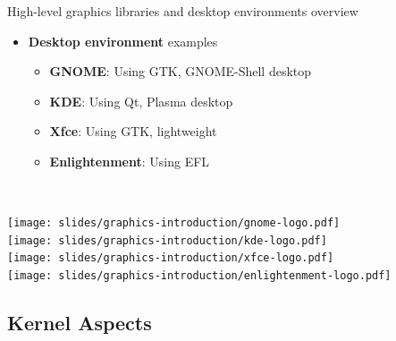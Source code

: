 \begin{frame}{High-level graphics libraries and desktop environments overview}
\begin{minipage}[b]{0.8\textwidth}
\begin{itemize}
  \textit{gives a consistent look and feel across the system}
  \item \textbf{Desktop environment} examples
    \begin{itemize}
    \item \textbf{GNOME}: Using GTK, GNOME-Shell desktop
    \item \textbf{KDE}: Using Qt, Plasma desktop
    \item \textbf{Xfce}: Using GTK, lightweight
    \item \textbf{Enlightenment}: Using EFL
    \end{itemize}
  \end{itemize}
  \vfill~
  \end{minipage}
  \begin{minipage}[b]{0.09\textwidth}
  \centering
  \texttt{[image: slides/graphics-introduction/gnome-logo.pdf]}\\
  \vspace{1em}
  \texttt{[image: slides/graphics-introduction/kde-logo.pdf]}\\
  \vspace{1em}
  \texttt{[image: slides/graphics-introduction/xfce-logo.pdf]}\\
  \vspace{0.5em}
  \texttt{[image: slides/graphics-introduction/enlightenment-logo.pdf]}
  \end{minipage}
\end{frame}

\subsection{Kernel Aspects}

